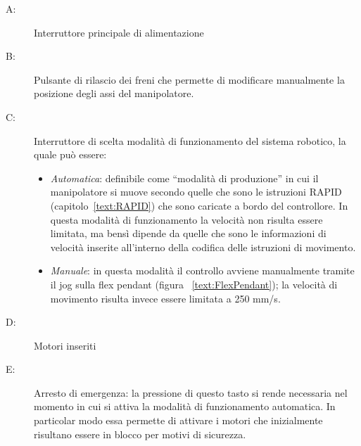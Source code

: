 \begin{description}
	\item[A:] Interruttore principale di alimentazione
	\item[B:] Pulsante di rilascio dei freni che permette di modificare manualmente la posizione degli assi del manipolatore.
	\item[C:] Interruttore di scelta modalità di funzionamento del sistema robotico, la quale può essere: 
	\begin{itemize}
		\item \emph{Automatica}: definibile come “modalità di produzione” in cui il manipolatore si muove secondo quelle che sono le istruzioni RAPID (capitolo~\vref{text:RAPID}) che sono caricate a bordo del controllore. In questa modalità di funzionamento la velocità non risulta essere limitata, ma bensì dipende da quelle che sono le informazioni di velocità inserite all’interno della codifica delle istruzioni di movimento.
		\item \emph{Manuale}: in questa modalità il controllo avviene manualmente tramite il jog sulla flex pendant (figura ~\vref{text:FlexPendant}); la velocità di movimento risulta invece essere limitata a 250 mm/s.
	\end{itemize}
	\item[D:] Motori inseriti
	\item[E:] Arresto di emergenza: la pressione di questo tasto si rende necessaria nel momento in cui si attiva la modalità di funzionamento automatica. In particolar modo essa permette di attivare i motori che inizialmente risultano essere in blocco per motivi di sicurezza.
\end{description}
